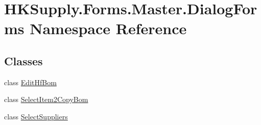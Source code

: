\hypertarget{namespace_h_k_supply_1_1_forms_1_1_master_1_1_dialog_forms}{}\section{H\+K\+Supply.\+Forms.\+Master.\+Dialog\+Forms Namespace Reference}
\label{namespace_h_k_supply_1_1_forms_1_1_master_1_1_dialog_forms}
\subsection*{Classes}
\begin{DoxyCompactItemize}
\item 
class \mbox{\hyperlink{class_h_k_supply_1_1_forms_1_1_master_1_1_dialog_forms_1_1_edit_hf_bom}{Edit\+Hf\+Bom}}
\item 
class \mbox{\hyperlink{class_h_k_supply_1_1_forms_1_1_master_1_1_dialog_forms_1_1_select_item2_copy_bom}{Select\+Item2\+Copy\+Bom}}
\item 
class \mbox{\hyperlink{class_h_k_supply_1_1_forms_1_1_master_1_1_dialog_forms_1_1_select_suppliers}{Select\+Suppliers}}
\end{DoxyCompactItemize}
